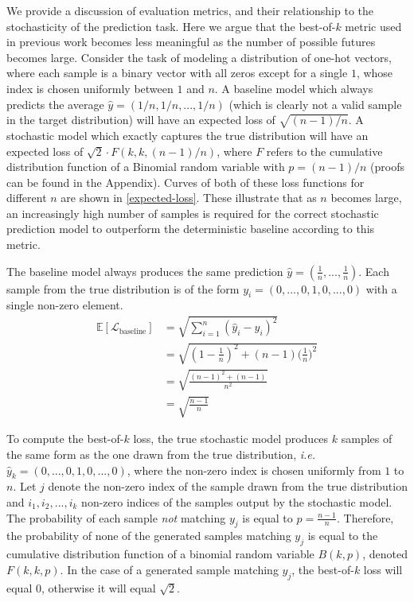 \documentclass{article}
\begin{document}
\begin{appendices}
We provide a discussion of evaluation metrics, and their relationship to the stochasticity of the prediction task.
Here we argue that the best-of-$k$ metric used in previous work \citep{Walker2016, Babaeizadeh2018, Denton2018} becomes less meaningful as the number of possible futures becomes large.
Consider the task of modeling a distribution of one-hot vectors, where each sample is a binary vector with all zeros except for a single $1$, whose index is chosen uniformly between $1$ and $n$.
A baseline model which always predicts the average $\hat{y} = (1/n, 1/n, ..., 1/n)$ (which is clearly not a valid sample in the target distribution) will have an expected loss of $\sqrt{(n-1)/n}$.
A stochastic model which exactly captures the true distribution will have an expected loss of $\sqrt{2} \cdot F(k, k, (n-1)/n)$, where $F$ refers to the cumulative distribution function of a Binomial random variable with $p=(n-1)/n$ (proofs can be found in the Appendix).
Curves of both of these loss functions for different $n$ are shown in \cref{expected-loss}.
These illustrate that as $n$ becomes large, an increasingly high number of samples is required for the correct stochastic prediction model to outperform the deterministic baseline according to this metric.

The baseline model always produces the same prediction $\hat{y} = (\frac{1}{n}, ..., \frac{1}{n})$.
Each sample from the true distribution is of the form $y_i = (0, ..., 0, 1, 0, ..., 0)$ with a single non-zero element.
\begin{align}
  \mathbb{E}[\mathcal{L}_{\mbox{baseline}}] &= \sqrt{\sum_{i=1}^n (\hat{y}_i - y_i)^2} \\
  &= \sqrt{(1-\frac{1}{n})^2 + (n-1)\Big ( \frac{1}{n} \Big )^2} \\
  &= \sqrt{\frac{(n-1)^2 + (n-1)}{n^2}} \\
  &= \sqrt{\frac{n-1}{n}}
\end{align}

To compute the best-of-$k$ loss, the true stochastic model produces $k$ samples of the same form as the one drawn from the true distribution, \emph{i.e.}\ $\hat{y}_k = (0, ..., 0, 1, 0, ..., 0)$, where the non-zero index is chosen uniformly from $1$ to $n$.
Let $j$ denote the non-zero index of the sample drawn from the true distribution and $i_1, i_2, ..., i_k$ non-zero indices of the samples output by the stochastic model.
The probability of each sample \textit{not} matching $y_j$ is equal to $p=\frac{n-1}{n}$.
Therefore, the probability of none of the generated samples matching $y_j$ is equal to the cumulative distribution function of a binomial random variable $B(k, p)$, denoted $F(k, k, p)$.
In the case of a generated sample matching $y_j$, the best-of-$k$ loss will equal 0, otherwise it will equal $\sqrt{2}$.


\end{appendices}
\end{document}
